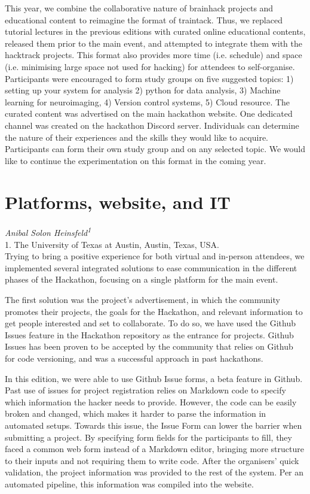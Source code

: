 \documentclass[10pt,a4paper,twocolumns]{proc}
\newcommand{\authors}[1]{\emph{\footnotesize #1} \\}
\newcommand{\affiliations}[1]{{\scriptsize #1} \\}
\begin{document}
This year, we combine the collaborative nature of brainhack projects and
educational content to reimagine the format of traintack. Thus, we
replaced tutorial lectures in the previous editions with curated online
educational contents, released them prior to the main event, and
attempted to integrate them with the hacktrack projects. This format
also provides more time (i.e. schedule) and space (i.e. minimising large
space not used for hacking) for attendees to self-organise. Participants
were encouraged to form study groups on five suggested topics: 1)
setting up your system for analysis 2) python for data analysis, 3)
Machine learning for neuroimaging, 4) Version control systems, 5) Cloud
resource. The curated content was advertised on the main hackathon
website. One dedicated channel was created on the hackathon Discord
server. Individuals can determine the nature of their experiences and
the skills they would like to acquire. Participants can form their own
study group and on any selected topic. We would like to continue the
experimentation on this format in the coming year.

\section{Platforms, website, and IT}
\authors{Anibal Solon Heinsfeld\textsuperscript{1}}
%
\affiliations{1. The University of Texas at Austin, Austin, Texas, USA.}

Trying to bring a positive experience for both virtual and in-person
attendees, we implemented several integrated solutions to ease
communication in the different phases of the Hackathon, focusing on a
single platform for the main event.

The first solution was the project's advertisement, in which the
community promotes their projects, the goals for the Hackathon, and
relevant information to get people interested and set to collaborate. To
do so, we have used the Github Issues feature in the Hackathon
repository as the entrance for projects. Github Issues has been proven
to be accepted by the community that relies on Github for code
versioning, and was a successful approach in past hackathons.

In this edition, we were able to use Github Issue forms, a beta feature
in Github. Past use of issues for project registration relies on
Markdown code to specify which information the hacker needs to provide.
However, the code can be easily broken and changed, which makes it
harder to parse the information in automated setups. Towards this issue,
the Issue Form can lower the barrier when submitting a project. By
specifying form fields for the participants to fill, they faced a common
web form instead of a Markdown editor, bringing more structure to their
inputs and not requiring them to write code. After the organisers' quick
validation, the project information was provided to the rest of the
system. Per an automated pipeline, this information was compiled into
the website.
\end{document}
